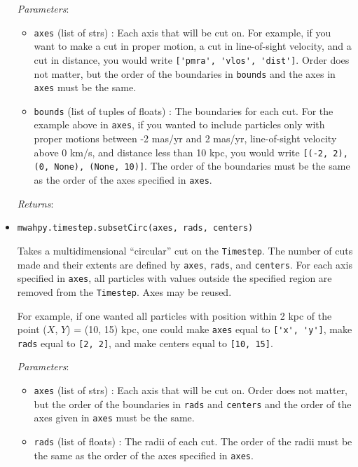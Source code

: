 \documentclass{article}
\begin{document}
\begin{itemize}
\textit{Parameters}: \begin{itemize}

\item \verb!axes! (list of strs) : Each axis that will be cut on. For example, if you want to make a cut in proper motion, a cut in line-of-sight velocity, and a cut in distance, you would write \verb!['pmra', 'vlos', 'dist']!. Order does not matter, but the order of the boundaries in \verb!bounds! and the axes in \verb!axes! must be the same.

\item \verb!bounds! (list of tuples of floats) : The boundaries for each cut. For the example above in \verb!axes!, if you wanted to include particles only with proper motions between -2 mas/yr and 2 mas/yr, line-of-sight velocity above 0 km/s, and distance less than 10 kpc, you would write \verb![(-2, 2), (0, None), (None, 10)]!. The order of the boundaries must be the same as the order of the axes specified in \verb!axes!.

\end{itemize}

\textit{Returns}: 



\item \verb!mwahpy.timestep.subsetCirc(axes, rads, centers)!

Takes a multidimensional ``circular'' cut on the \verb!Timestep!. The number of cuts made and their extents are defined by \verb!axes!, \verb!rads!, and \verb!centers!. For each axis specified in \verb!axes!, all particles with values outside the specified region are removed from the \verb!Timestep!. Axes may be reused.

For example, if one wanted all particles with position within 2 kpc of the point ($X$, $Y$) = (10, 15) kpc, one could make \verb!axes! equal to \verb!['x', 'y']!, make \verb!rads! equal to \verb![2, 2]!, and make centers equal to \verb![10, 15]!.

\textit{Parameters}: \begin{itemize}

\item \verb!axes! (list of strs) : Each axis that will be cut on. Order does not matter, but the order of the boundaries in \verb!rads! and \verb!centers! and the order of the axes given in \verb!axes! must be the same.

\item \verb!rads! (list of floats) : The radii of each cut. The order of the radii must be the same as the order of the axes specified in \verb!axes!.


\end{itemize}
\end{itemize}
\end{document}
